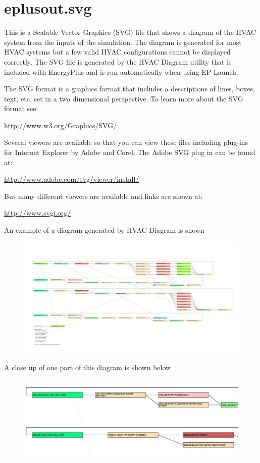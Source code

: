 \section{eplusout.svg}\label{eplusout.svg}

This is a Scalable Vector Graphics (SVG) file that shows a diagram of the HVAC system from the inputs of the simulation. The diagram is generated for most HVAC systems but a few valid HVAC configurations cannot be displayed correctly. The SVG file is generated by the HVAC Diagram utility that is included with EnergyPlus and is run automatically when using EP-Launch.

The SVG format is a graphics format that includes a descriptions of lines, boxes, text, etc. set in a two dimensional perspective. To learn more about the SVG format see:

\url{http://www.w3.org/Graphics/SVG/}

Several viewers are available so that you can view these files including plug-ins for Internet Explorer by Adobe and Corel. The Adobe SVG plug in can be found at:

\url{http://www.adobe.com/svg/viewer/install/}

But many different viewers are available and links are shown at:

\url{http://www.svgi.org/}

An example of a diagram generated by HVAC Diagram is shown

\begin{figure}[htbp]
\centering
\includegraphics{media/image023.jpg}
\caption{}
\end{figure}

A close up of one part of this diagram is shown below

\begin{figure}[htbp]
\centering
\includegraphics{media/image024.jpg}
\caption{}
\end{figure}

